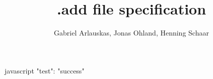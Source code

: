 \documentclass[12pt,oneside]{scrartcl}
\title{.add file specification}
\author{Gabriel Arlauskas, Jonas Ohland, Henning Schaar}
\begin{document}
\maketitle


\pagebreak
\tableofcontents
\pagebreak

    \begin{scodebox}{javascript}
    {
        "test": "success"
    }
    \end{scodebox}
\end{document}
